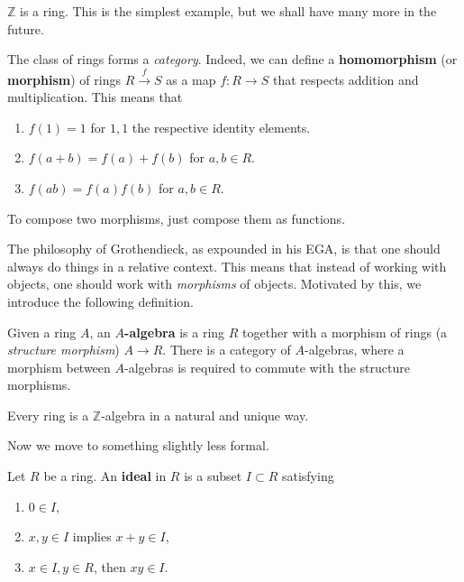 \begin{example}
$\mathbb{Z}$ is a ring. This is the simplest example, but we shall have many
more in the future.
\end{example}

The class of rings forms a \emph{category}. Indeed, we can define a
\textbf{homomorphism} (or \textbf{morphism}) of rings $R \stackrel{f}{\to} S$
as a map $f: R \to S$ that respects addition and multiplication. This means
that

\begin{enumerate}
  \item $f(1) = 1$ for $1, 1$ the respective identity elements.
  \item $f(a+b) = f(a)+f(b)$ for $a,b \in R$.
  \item $f(ab) = f(a)f(b)$ for $a,b \in R$.
\end{enumerate}

To compose two morphisms, just compose them as functions.

The philosophy of Grothendieck, as expounded in his EGA, is that one should
always do things in a relative context. This means that instead of working with
objects, one should work with \emph{morphisms} of objects. Motivated by this,
we introduce the following definition.

\begin{definition}
Given a ring $A$, an \textbf{$A$-algebra} is a ring $R$ together with a
morphism of rings (a \emph{structure morphism}) $A \to R$. There is a category
of $A$-algebras, where a morphism between $A$-algebras is required to commute
with the structure morphisms.
\end{definition}

\begin{example}
Every ring is a $\mathbb{Z}$-algebra in a natural and unique way.
\end{example}

Now we move to something slightly less formal.

\begin{definition}
Let $R$ be a ring. An \textbf{ideal} in $R$ is a subset $I \subset R$
satisfying

\begin{enumerate}
  \item $0 \in I$,
  \item $x,y \in I$ implies $x+y \in I$,
  \item $x \in I, y \in R$, then $xy \in I$.
\end{enumerate}
\end{definition}


